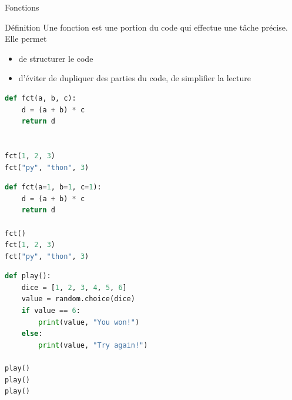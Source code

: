 \begin{frame}[fragile]{Fonctions}
    
    \begin{block}{Définition}
        \medskip
        Une fonction est une portion du code qui effectue une tâche précise. Elle permet
        \begin{itemize}
            \item de structurer le code 
            \item d'éviter de dupliquer des parties du code, de simplifier la lecture
        \end{itemize}
    \end{block}
  
    \begin{overprint}
      
\begin{lstlisting}[language=Python, morekeywords={}, numbers=none]
def fct(a, b, c):
    d = (a + b) * c
    return d


fct(1, 2, 3)
fct("py", "thon", 3)
\end{lstlisting}
  
\begin{lstlisting}[language=Python, morekeywords={}, numbers=none]
def fct(a=1, b=1, c=1):
    d = (a + b) * c
    return d

fct()
fct(1, 2, 3)
fct("py", "thon", 3)
\end{lstlisting}

\begin{lstlisting}[language=Python, morekeywords={}, numbers=none]
def play():
    dice = [1, 2, 3, 4, 5, 6]
    value = random.choice(dice)
    if value == 6:
        print(value, "You won!")
    else:
        print(value, "Try again!")

play()
play()
play()
\end{lstlisting}
    \end{overprint}

  \end{frame}


